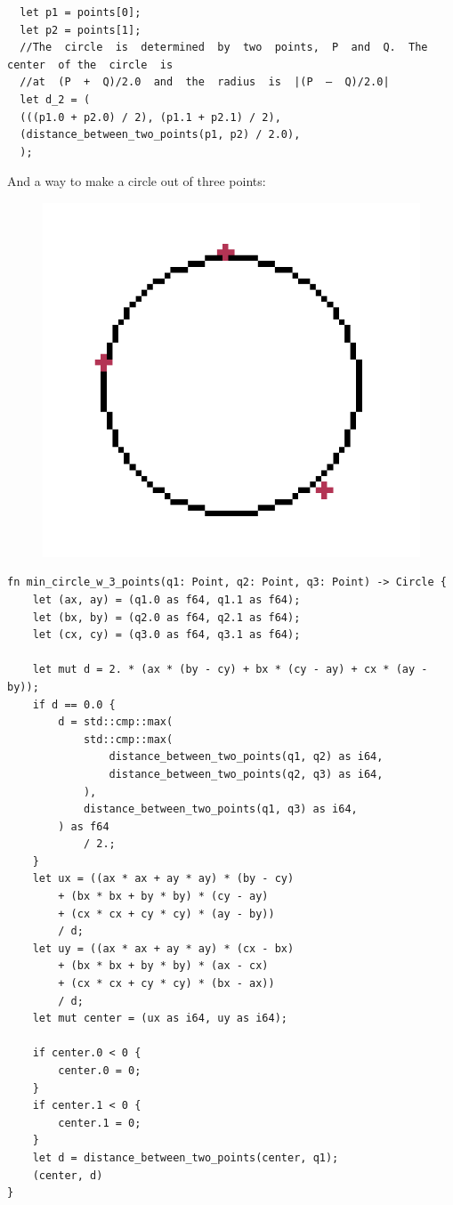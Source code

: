 \documentclass[12pt,openany,a4,usenames,dvipsnames]{book}
\begin{document}
\begin{verbatim}
  let p1 = points[0];
  let p2 = points[1];
  //The  circle  is  determined  by  two  points,  P  and  Q.  The  center  of the  circle  is
  //at  (P  +  Q)/2.0  and  the  radius  is  |(P  –  Q)/2.0|
  let d_2 = (
  (((p1.0 + p2.0) / 2), (p1.1 + p2.1) / 2),
  (distance_between_two_points(p1, p2) / 2.0),
  );
\end{verbatim}

And a way to make a circle out of three points:

\begin{figure}[H]
\centering
\includegraphics[scale=0.25,keepaspectratio]{figures/triangle_circle.png}
\end{figure}
\begin{verbatim}
fn min_circle_w_3_points(q1: Point, q2: Point, q3: Point) -> Circle {
    let (ax, ay) = (q1.0 as f64, q1.1 as f64);
    let (bx, by) = (q2.0 as f64, q2.1 as f64);
    let (cx, cy) = (q3.0 as f64, q3.1 as f64);

    let mut d = 2. * (ax * (by - cy) + bx * (cy - ay) + cx * (ay - by));
    if d == 0.0 {
        d = std::cmp::max(
            std::cmp::max(
                distance_between_two_points(q1, q2) as i64,
                distance_between_two_points(q2, q3) as i64,
            ),
            distance_between_two_points(q1, q3) as i64,
        ) as f64
            / 2.;
    }
    let ux = ((ax * ax + ay * ay) * (by - cy)
        + (bx * bx + by * by) * (cy - ay)
        + (cx * cx + cy * cy) * (ay - by))
        / d;
    let uy = ((ax * ax + ay * ay) * (cx - bx)
        + (bx * bx + by * by) * (ax - cx)
        + (cx * cx + cy * cy) * (bx - ax))
        / d;
    let mut center = (ux as i64, uy as i64);

    if center.0 < 0 {
        center.0 = 0;
    }
    if center.1 < 0 {
        center.1 = 0;
    }
    let d = distance_between_two_points(center, q1);
    (center, d)
}
\end{verbatim}
\end{document}
